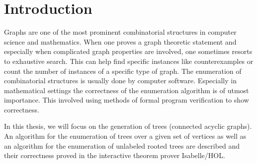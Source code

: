 
\chapter{Introduction}\label{chapter:introduction}

Graphs are one of the most prominent combinatorial structures in computer science and mathematics.
When one proves a graph theoretic statement and especially when complicated graph properties are involved, one sometimes resorts to exhaustive search.
This can help find specific instances like counterexamples or count the number of instances of a specific type of graph.
The enumeration of combinatorial structures is usually done by computer software.
Especially in mathematical settings the correctness of the enumeration algorithm is of utmost importance.
This involved using methods of formal program verification to show correctness.

In this thesis, we will focus on the generation of trees (connected acyclic graphs).
An algorithm for the enumeration of trees over a given set of vertices as well as an algorithm for the enumeration of unlabeled rooted trees are described and their correctness proved in the interactive theorem prover Isabelle/HOL.
